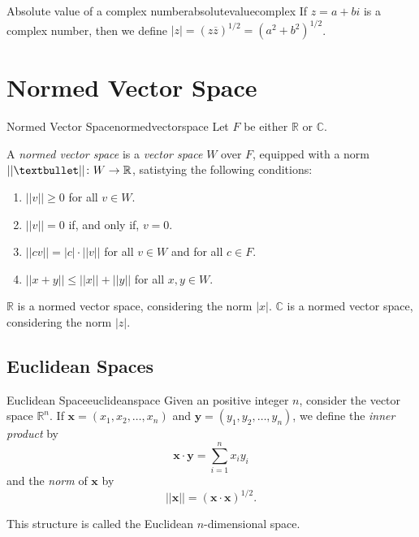 \begin{defn}{Absolute value of a complex number}{absolutevaluecomplex}
	If \(z = a + bi\) is a complex number, then we define \(|z| = (z\overline z)^{1/2} = (a^2 + b^2)^{1/2}\).
\end{defn}

\section{Normed Vector Space}

\begin{defn}{Normed Vector Space}{normedvectorspace}
	Let \(F\) be either \(\mathbb{R}\) or \(\mathbb{C}\).

	A \emph{normed vector space} is a \emph{vector space} \(W\) over \(F\), equipped with a norm \(||\textbullet||\colon W \to \mathbb{R}\), satistying the following conditions:
	\begin{enumerate}
		\item \(||v|| \geq 0\) for all \(v \in W\).
		\item \(||v|| = 0\) if, and only if, \(v = 0\).
		\item \(||cv|| = |c| \cdot ||v||\) for all \(v \in W\) and for all \(c \in F\).
		\item \(||x + y|| \leq ||x|| + ||y||\) for all \(x, y \in W\).
	\end{enumerate}
\end{defn}

\begin{exmp}{}{}
	\(\mathbb{R}\) is a normed vector space, considering the norm \(|x|\).
	\(\mathbb{C}\) is a normed vector space, considering the norm \(|z|\).
\end{exmp}

\subsection{Euclidean Spaces}

\begin{defn}{Euclidean Space}{euclideanspace}
	Given an positive integer \(n\), consider the vector space \(\mathbb{R}^n\).
	If \(\mathbf x = (x_1, x_2, \dots, x_n)\) and \(\mathbf y = (y_1, y_2, \dots, y_n)\), we define the \emph{inner product} by \[
		\mathbf x \cdot \mathbf y = \sum_{i=1}^n x_iy_i
	\]
	and the \emph{norm} of \(\mathbf x\) by \[
		||\mathbf x|| = (\mathbf x \cdot \mathbf x)^{1/2}.
	\]

	This structure is called the Euclidean \(n\)-dimensional space.
\end{defn}

